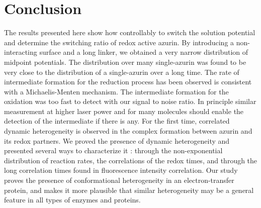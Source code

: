 \documentclass[journal=jacsat,manuscript=article]{achemso}
\begin{document}
\section{Conclusion}
The results presented here show how controllably to switch the solution potential and determine the switching ratio of redox active azurin.
By introducing a non-interacting surface and a long linker, we obtained a very narrow distribution of midpoint potentials.
The distribution over many single-azurin was found to be very close to the distribution of a single-azurin over a long time.
The rate of intermediate formation for the reduction process has been observed is consistent with a Michaelis-Menten mechanism.
The intermediate formation for the oxidation was too fast to detect with our signal to noise ratio.
In principle similar measurement at higher laser power and for many molecules should enable the detection of the intermediate if there is any.
For the first time, correlated dynamic heterogeneity is observed in the complex formation between azurin and its redox partners.
We proved the presence of dynamic heterogeneity and presented several ways to characterize it : through the non-exponential distribution of reaction rates, the correlations of the redox times, and through the long correlation times found in fluorescence intensity correlation.
Our study proves the presence of conformational heterogeneity in an electron-transfer protein, and makes it more plausible that similar heterogeneity may be a general feature in all types of enzymes and proteins.

% 

\end{document}
